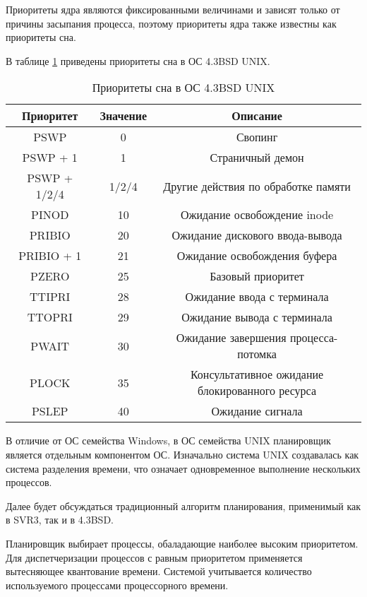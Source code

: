 Приоритеты ядра являются фиксированными величинами и зависят только
от причины засыпания процесса, поэтому приоритеты ядра также известны как
приоритеты сна. 

В таблице \ref{tbl:sleep2} приведены приоритеты сна в ОС 4.3BSD UNIX.

\begin{table}[H]
  \centering
  \caption{Приоритеты сна в ОС 4.3BSD UNIX}
  \begin{tabular}{|c|c|c|}
    \hline
    Приоритет & Значение & Описание \\
    \hline
    PSWP & 0 & Свопинг \\
    \hline
    PSWP + 1 & 1 & Страничный демон \\
    \hline 
    PSWP + 1/2/4 & 1/2/4 & Другие действия по обработке памяти \\
    \hline
    PINOD & 10 & Ожидание освобождение inode \\
    \hline
    PRIBIO & 20 & Ожидание дискового ввода-вывода \\ 
    \hline
    PRIBIO + 1 & 21 & Ожидание освобождения буфера \\
    \hline
    PZERO & 25 & Базовый приоритет\\
    \hline
    TTIPRI & 28 & Ожидание ввода с терминала\\
    \hline
    TTOPRI & 29 & Ожидание вывода с терминала\\
    \hline
    PWAIT & 30 & Ожидание завершения процесса-потомка\\
    \hline
    PLOCK & 35 & \makecell{Консультативное ожидание\\блокированного ресурса}\\
    \hline
    PSLEP & 40 & Ожидание сигнала\\
    \hline
  \end{tabular}
  \label{tbl:sleep2}
\end{table}

В отличие от ОС семейства Windows, в ОС семейства UNIX планировщик
является отдельным компонентом ОС. Изначально система UNIX 
создавалась как система разделения времени, что означает 
одновременное выполнение нескольких процессов.

Далее будет обсуждаться традиционный алгоритм планирования,
применимый как в SVR3, так и в 4.3BSD.

Планировщик выбирает процессы, обаладающие наиболее высоким приоритетом.
Для диспетчеризации процессов с равным приоритетом применяется 
вытесняющее квантование времени. Системой учитывается количество 
используемого процессами процессорного времени.

